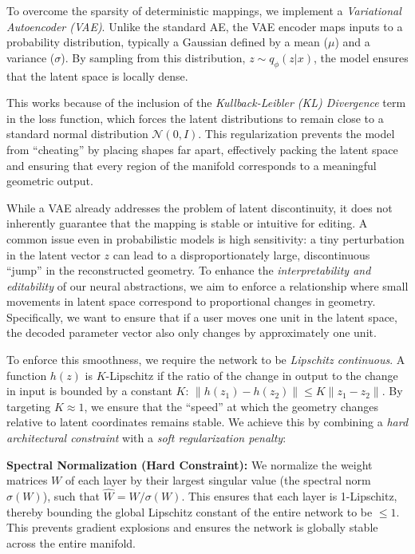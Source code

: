 \documentclass{thesis}
\begin{document}
To overcome the sparsity of deterministic mappings, we implement a \textit{Variational Autoencoder (VAE)}. Unlike the standard AE, the VAE encoder maps inputs to a probability distribution, typically a Gaussian defined by a mean ($\mu$) and a variance ($\sigma$). By sampling from this distribution, $z \sim q_\phi(z|x)$, the model ensures that the latent space is locally dense. 

This works because of the inclusion of the \textit{Kullback-Leibler (KL) Divergence} term in the loss function, which forces the latent distributions to remain close to a standard normal distribution $\mathcal{N}(0, I)$. This regularization prevents the model from ``cheating'' by placing shapes far apart, effectively packing the latent space and ensuring that every region of the manifold corresponds to a meaningful geometric output.

While a VAE already addresses the problem of latent discontinuity, it does not inherently guarantee that the mapping is stable or intuitive for editing. A common issue even in probabilistic models is high sensitivity: a tiny perturbation in the latent vector $z$ can lead to a disproportionately large, discontinuous ``jump'' in the reconstructed geometry. To enhance the \textit{interpretability and editability} of our neural abstractions, we aim to enforce a relationship where small movements in latent space correspond to proportional changes in geometry. Specifically, we want to ensure that if a user moves one unit in the latent space, the decoded parameter vector also only changes by approximately one unit.

To enforce this smoothness, we require the network to be \textit{Lipschitz continuous}. A function $h(z)$ is $K$-Lipschitz if the ratio of the change in output to the change in input is bounded by a constant $K$: $\|h(z_1) - h(z_2)\| \leq K \|z_1 - z_2\|$. By targeting $K \approx 1$, we ensure that the ``speed'' at which the geometry changes relative to latent coordinates remains stable. We achieve this by combining a \textit{hard architectural constraint} with a \textit{soft regularization penalty}:

\textbf{Spectral Normalization (Hard Constraint):} We normalize the weight matrices $W$ of each layer by their largest singular value (the spectral norm $\sigma(W)$), such that $\hat{W} = W / \sigma(W)$. This ensures that each layer is 1-Lipschitz, thereby bounding the global Lipschitz constant of the entire network to be $\leq 1$. This prevents gradient explosions and ensures the network is globally stable across the entire manifold.
\end{document}
